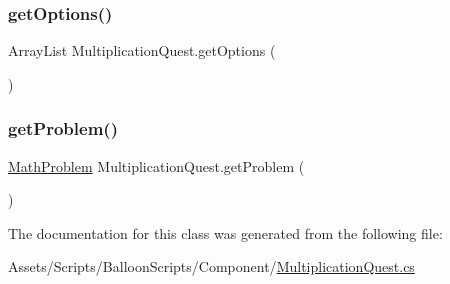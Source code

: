 \subsubsection{\texorpdfstring{get\+Options()}{getOptions()}}
{\footnotesize\ttfamily Array\+List Multiplication\+Quest.\+get\+Options (\begin{DoxyParamCaption}{ }\end{DoxyParamCaption})\hspace{0.3cm}{\ttfamily [inline]}}

\mbox{\label{classMultiplicationQuest_a15282e5bfe52cf5d034c11b8eeff3a72}} 
\subsubsection{\texorpdfstring{get\+Problem()}{getProblem()}}
{\footnotesize\ttfamily \hyperlink{classMathProblem}{Math\+Problem} Multiplication\+Quest.\+get\+Problem (\begin{DoxyParamCaption}{ }\end{DoxyParamCaption})\hspace{0.3cm}{\ttfamily [inline]}}



The documentation for this class was generated from the following file\+:\begin{DoxyCompactItemize}
\item 
Assets/\+Scripts/\+Balloon\+Scripts/\+Component/\hyperlink{MultiplicationQuest_8cs}{Multiplication\+Quest.\+cs}\end{DoxyCompactItemize}
